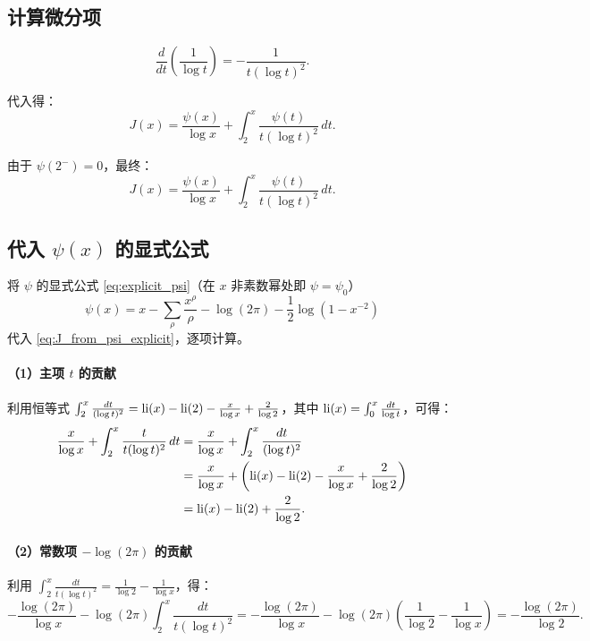 \subsection*{计算微分项}

\[
\frac{d}{dt}\!\left(\frac{1}{\log t}\right) = -\frac{1}{t(\log t)^2}.
\]

代入得：
\[
J(x) = \frac{\psi(x)}{\log x} + \int_2^x \frac{\psi(t)}{t(\log t)^2}\, dt.
\]

由于 $\psi(2^-)=0$，最终：
\begin{equation}
\boxed{J(x) = \frac{\psi(x)}{\log x} + \int_2^x \frac{\psi(t)}{t(\log t)^2}\, dt.}
\label{eq:J_from_psi_explicit}
\end{equation}

\subsection*{代入 $\psi(x)$ 的显式公式}

将 $\psi$ 的显式公式 \eqref{eq:explicit_psi}（在 $x$ 非素数幂处即 $\psi=\psi_0$）
\[
\psi(x)=x-\sum_\rho \frac{x^\rho}{\rho}-\log(2\pi)-\frac12\log(1-x^{-2})
\]
代入 \eqref{eq:J_from_psi_explicit}，逐项计算。

\paragraph{（1）主项 \texorpdfstring{$t$}{t} 的贡献}
利用恒等式 $ \int_2^x \frac{dt}{(\log t)^2} = \operatorname{li}(x) - \operatorname{li}(2) - \frac{x}{\log x} + \frac{2}{\log 2}$，其中 $\operatorname{li}(x)=\int_0^x \frac{dt}{\log t}$，可得：
\[
\begin{aligned}
\frac{x}{\log x} + \int_2^x \frac{t}{t(\log t)^2}\, dt
&= \frac{x}{\log x} + \int_2^x \frac{dt}{(\log t)^2} \\
&= \frac{x}{\log x} + \left( \operatorname{li}(x) - \operatorname{li}(2) - \frac{x}{\log x} + \frac{2}{\log 2} \right) \\
&= \operatorname{li}(x) - \operatorname{li}(2) + \frac{2}{\log 2}.
\end{aligned}
\]

\paragraph{（2）常数项 \texorpdfstring{$-\log(2\pi)$}{-log(2 pi)} 的贡献}
利用 $ \int_2^x \frac{dt}{t(\log t)^2} = \frac{1}{\log 2} - \frac{1}{\log x}$，得：
\[
-\frac{\log(2\pi)}{\log x} - \log(2\pi) \int_2^x \frac{dt}{t(\log t)^2}
= -\frac{\log(2\pi)}{\log x} - \log(2\pi)\left( \frac{1}{\log 2} - \frac{1}{\log x} \right)
= -\frac{\log(2\pi)}{\log 2}.
\]

